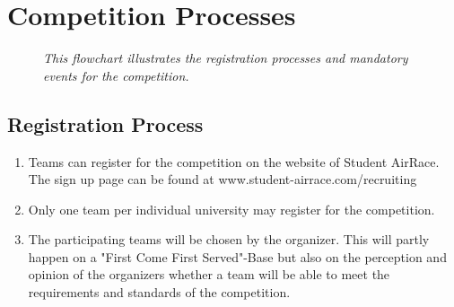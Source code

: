     \newpage
    \section{Competition Processes}

    \begin{figure}[h!]
      \centering
     \caption{\textit{This flowchart illustrates the registration processes and mandatory events for the competition.}}
     \end{figure}

    \subsection{Registration Process}
    \begin{enumerate}
      \item Teams can register for the competition on the website of Student AirRace. The sign up page can be found at www.student-airrace.com/recruiting 
      \item Only one team per individual university may register for the competition.  
      \item The participating teams will be chosen by the organizer. This will partly happen on a "First Come First Served"-Base but also
      on the perception and opinion of the organizers whether a team will be able to meet the requirements and standards of the competition. 
    \end{enumerate}

